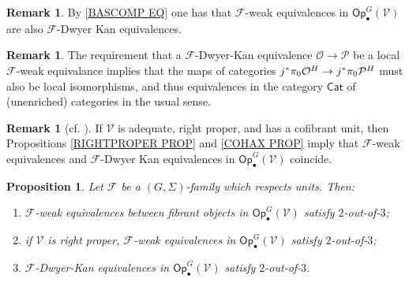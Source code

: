 \documentclass[a4paper,10pt
,draft
]{article}%
\numberwithin{equation}{section}
\numberwithin{figure}{section}
\newtheorem{proposition}[equation]{Proposition}%
\theoremstyle{definition} %
\newtheorem{remark}[equation]{Remark}%
\newcommand{\F}{\ensuremath{\mathcal F}}
\newcommand{\V}{\ensuremath{\mathcal V}}
\renewcommand{\O}{\ensuremath{\mathcal O}}
\renewcommand{\P}{\ensuremath{\mathcal P}}
\newcommand{\1}{\ensuremath{\mathbbm 1}}%
\begin{document}
\begin{remark}\label{FEWFDK REM}
By \eqref{BASCOMP EQ}
one has that $\F$-weak equivalences in $\mathsf{Op}^G_\bullet(\V)$
are also $\F$-Dwyer Kan equivalences.
\end{remark}


\begin{remark}\label{CATEQUIV REM}
The requirement that 
a $\F$-Dwyer-Kan equivalence $\O \to \P$
be a local $\F$-weak equivalance
implies that the maps of categories 
$j^{\**}\pi_0 \O^H \to j^{\**}\pi_0 \P^H$
must also be local isomorphisms, 
and thus equivalences in the category $\mathsf{Cat}$
of (unenriched) categories in the usual sense.
\end{remark}




\begin{remark}[{cf. \cite[Prop. 2.20]{BM13}}]
If $\V$ is adequate, right proper, and has a cofibrant unit,
then Propositions \ref{RIGHTPROPER PROP} and \ref{COHAX PROP}
imply that $\F$-weak equivalences and $\F$-Dwyer Kan equivalences
in $\mathsf{Op}^G_\bullet(\V)$ coincide.
\end{remark}







\begin{proposition}\label{2OUTOF3 PROP}
Let $\F$ be a $(G,\Sigma)$-family which respects units. 
Then:
\begin{enumerate}[label=(\roman*)]
\item $\F$-weak equivalences between fibrant objects in $\mathsf{Op}^G_\bullet(\V)$
satisfy $2$-out-of-$3$;
\item if $\V$ is right proper, $\F$-weak equivalences in $\mathsf{Op}^G_\bullet(\V)$
satisfy $2$-out-of-$3$;
\item $\F$-Dwyer-Kan equivalences in $\mathsf{Op}^G_\bullet(\V)$
satisfy $2$-out-of-$3$.
\end{enumerate}
\end{proposition}
\end{document}
